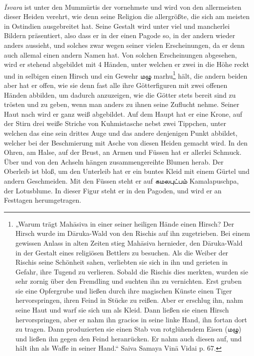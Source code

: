 \documentclass{article}
\newcommand{\TamilText}[1]{\texttamil{#1}}
\newcommand{\tam}[1]{\TamilText{#1}}
\begin{document}
\paragraph{}
\emph{\={I}svara} ist unter den Mumm\={u}rtis der vornehmste und wird von den allermeisten dieser Heiden verehrt, wie denn seine Religion die allergrößte, die sich am meisten in Ostindien ausgebreitet hat. Seine Gestalt wird unter viel und mancherlei Bildern präsentiert, also dass er in der einen Pagode so, in der andern wieder anders aussieht, und solches zwar wegen seiner vielen Erscheinungen, da er denn auch allemal einen andern Namen hat. Von solchen Erscheinungen abgesehen, wird er stehend abgebildet mit 4 Händen, unter welchen er zwei in die Höhe reckt und in selbigen einen Hirsch und ein Gewehr \tam{மழு} marhu\footnote{„Warum trägt Mah\={a}siva in einer seiner heiligen Hände einen Hirsch? Der Hirsch wurde im D\={a}ruka-Wald von den Rischis auf ihn zugetrieben. Bei einem gewissen Anlass in alten Zeiten stieg Mah\={a}siva hernieder, den D\={a}ruka-Wald in der Gestalt eines religiösen Bettlers zu besuchen. Als die Weiber der Rischis seine Schönheit sahen, verliebten sie sich in ihn und gerieten in Gefahr, ihre Tugend zu verlieren. Sobald die Rischis dies merkten, wurden sie sehr zornig über den Fremdling und suchten ihn zu vernichten. Erst gruben sie eine Opfergrube und ließen durch ihre magischen Künste einen Tiger hervorspringen, ihren Feind in Stücke zu reißen. Aber er erschlug ihn, nahm seine Haut und warf sie sich um als Kleid. Dann ließen sie einen Hirsch hervorspringen, aber er nahm ihn gracios in seine linke Hand, ihn fortan dort zu tragen. Dann produzierten sie einen Stab von rotglühendem Eisen (\tam{மழு}) und ließen ihn gegen den Feind heranrücken. Er nahm auch diesen auf, und hält ihn als Waffe in seiner Hand.“ Saiva Samaya Vin\={a} Vidai p. 67.} hält, die andern beiden aber hat er offen, wie sie denn fast alle ihre Götterfiguren mit zwei offenen Händen abbilden, um dadurch anzuzeigen, wie die Götter stets bereit sind zu trösten und zu geben, wenn man anders zu ihnen seine Zuflucht nehme. Seiner Haut nach wird er ganz weiß abgebildet. Auf dem Haupt hat er eine Krone, auf der Stirn drei weiße Striche von Kuhmistasche nebst zwei Tippchen, unter welchen das eine sein drittes Auge und das andere denjenigen Punkt abbildet, welcher bei der Beschmierung mit Asche von diesen Heiden gemacht wird. In den Ohren, am Halse, auf der Brust, an Armen und Füssen hat er allerlei Schmuck. Über und von den Achseln hängen zusammengereihte Blumen herab. Der Oberleib ist bloß, um den Unterleib hat er ein buntes Kleid mit einem Gürtel und andern Geschmeiden. Mit den Füssen steht er auf \tam{கமலபுட்பம்} Kamalapuschpa, der Lotusblume. In dieser Figur steht er in den Pagoden, und wird er an Festtagen herumgetragen.
\end{document}
